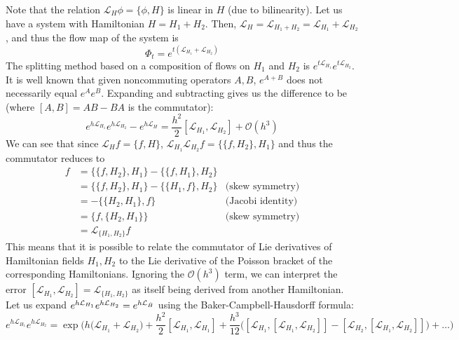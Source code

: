       Note that the relation $\mathcal{L}_H \phi = \{\phi, H\}$ is linear in $H$ (due to bilinearity). Let us have a system with Hamiltonian $H = H_1 + H_2$. Then, $\mathcal{L}_H = \mathcal{L}_{H_1 + H_2} = \mathcal{L}_{H_1} + \mathcal{L}_{H_2}$, and thus the flow map of the system is 
      \begin{equation}
        \Phi_t = e^{ t(\mathcal{L}_{H_1} + \mathcal{L}_{H_2})}
      \end{equation}
      The splitting method based on a composition of flows on $H_1$ and $H_2$ is $e^{t \mathcal{L}_{H_1}} e^{t \mathcal{L}_{H_2}}$. It is well known that given noncommuting operators $A, B$, $e^{A + B}$ does not necessarily equal $e^A e^B$. Expanding and subtracting gives us the difference to be (where $[A, B] = AB - BA$ is the commutator): 
      \begin{equation}
        e^{h \mathcal{L}_{H_1}} e^{h \mathcal{L}_{H_2}} - e^{h \mathcal{L}_H} = \frac{h^2}{2} [\mathcal{L}_{H_1}, \mathcal{L}_{H_2}] + \mathcal{O}(h^3)
      \end{equation}
      We can see that since $\mathcal{L}_{H} f = \{f, H\}$, $\mathcal{L}_{H_1} \mathcal{L}_{H_2} f = \{ \{f, H_2\}, H_1 \}$ and thus the commutator reduces to 
      \begin{align*}
        [\mathcal{L}_{H_1}, \mathcal{L}_{H_2}] f & = \{ \{ f, H_2\}, H_1\} - \{ \{ f, H_1\}, H_2\} & \\
        & = \{ \{ f, H_2\}, H_1\} - \{ \{ H_1, f\}, H_2\} & \text{(skew symmetry)}\\
        & = - \{ \{H_2, H_1\}, f \} & \text{(Jacobi identity)} \\
        & = \{f, \{H_2, H_1\}\} & \text{(skew symmetry)} \\
        & = \mathcal{L}_{\{H_1, H_2\}} f 
      \end{align*}
      This means that it is possible to relate the commutator of Lie derivatives of Hamiltonian fields $H_1, H_2$ to the Lie derivative of the Poisson bracket of the corresponding Hamiltonians. Ignoring the $\mathcal{O}(h^3)$ term, we can interpret the error $[\mathcal{L}_{H_1}, \mathcal{L}_{H_2}] = \mathcal{L}_{\{H_1, H_2\}}$ as itself being derived from another Hamiltonian. Let us expand $e^{h \mathcal{L}_{H_1}} e^{h \mathcal{L}_{H_2}} = e^{h \mathcal{L}_{\Tilde{H}}}$ using the Baker-Campbell-Hausdorff formula: 
      \begin{equation}
        e^{h \mathcal{L}_{H_1}} e^{h \mathcal{L}_{H_2}} = \exp \bigg( h\big(\mathcal{L}_{H_1} + \mathcal{L}_{H_2}\big) + \frac{h^2}{2} [\mathcal{L}_{H_1}, \mathcal{L}_{H_1}] + \frac{h^3}{12} \big( [\mathcal{L}_{H_1}, [\mathcal{L}_{H_1}, \mathcal{L}_{H_2}]] - [\mathcal{L}_{H_2}, [\mathcal{L}_{H_1}, \mathcal{L}_{H_2}]] \big) + \ldots \bigg)
      \end{equation}
